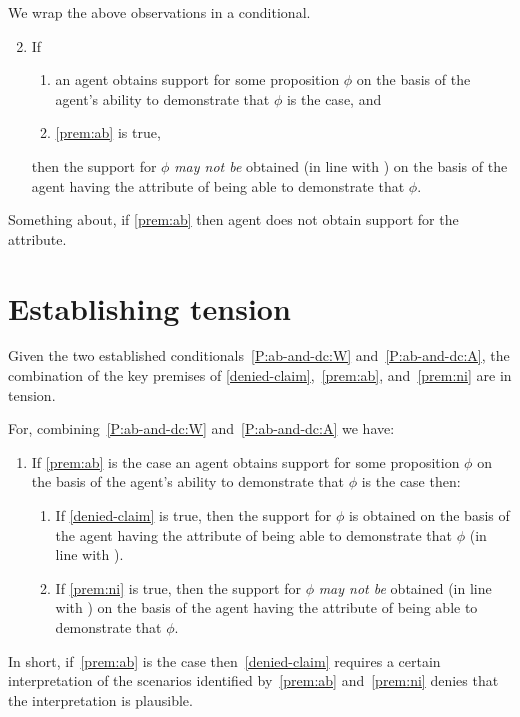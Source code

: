 \begin{note}
  We wrap the above observations in a conditional.
  \begin{enumerate}[label=(C\arabic*), ref=(C\arabic*)]
    \setcounter{enumi}{1}
  \item\label{P:ab-and-dc:A} If
    \begin{enumerate}[label=(C2\alph*), ref=(C2\alph*)]
    \item an agent obtains support for some proposition \(\phi\) on the basis of the agent's ability to demonstrate that \(\phi\) is the case, and
    \item \ref{prem:ab} is true,
    \end{enumerate}
    then the support for \(\phi\) \emph{may not be} obtained (in line with \AR{}) on the basis of the agent having the attribute of being able to demonstrate that \(\phi\).
  \end{enumerate}
\end{note}

\begin{note}
  Something about, if \ref{prem:ab} then agent does not obtain support for the attribute.
\end{note}

\section{Establishing tension}
\label{sec:establishing-tension}

\begin{note}[Summary]
  Given the two established conditionals~\ref{P:ab-and-dc:W} and~\ref{P:ab-and-dc:A}, the combination of the key premises of \ref{denied-claim},~\ref{prem:ab}, and~\ref{prem:ni} are in tension.

  For, combining~\ref{P:ab-and-dc:W} and~\ref{P:ab-and-dc:A} we have:
  \begin{enumerate}[label=(CC), ref=(CC)]
  \item If \ref{prem:ab} is the case an agent obtains support for some proposition \(\phi\) on the basis of the agent's ability to demonstrate that \(\phi\) is the case then:
    \begin{enumerate}[label=(C\arabic*\(\sim\)), ]
    \item If \ref{denied-claim} is true, then the support for \(\phi\) is obtained on the basis of the agent having the attribute of being able to demonstrate that \(\phi\) (in line with \AR{}).
    \item If \ref{prem:ni} is true, then the support for \(\phi\) \emph{may not be} obtained (in line with \AR{}) on the basis of the agent having the attribute of being able to demonstrate that \(\phi\).
    \end{enumerate}
  \end{enumerate}
  In short, if~\ref{prem:ab} is the case then~\ref{denied-claim} requires a certain interpretation of the scenarios identified by~\ref{prem:ab} and~\ref{prem:ni} denies that the interpretation is plausible.
\end{note}

